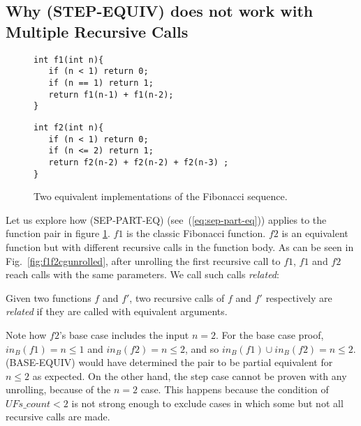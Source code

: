 \subsection{Why (STEP-EQUIV) does not work with Multiple Recursive Calls}
\label{sec:appstepmrc}
\begin{figure}[h]
\begin{center}
\begin{minipage}{7 cm}
\begin{lstlisting}
int f1(int n){
   if (n < 1) return 0;
   if (n == 1) return 1; 
   return f1(n-1) + f1(n-2);
}
\end{lstlisting}
\end{minipage}
\begin{minipage}{7 cm}
\begin{lstlisting}
int f2(int n){
   if (n < 1) return 0;
   if (n <= 2) return 1;
   return f2(n-2) + f2(n-2) + f2(n-3) ;
}
\end{lstlisting}
\end{minipage}
\caption{Two equivalent implementations of the Fibonacci sequence.}
\label{fig:f1f2}
\end{center}
\end{figure}
Let us explore how (SEP-PART-EQ) (see~(\ref{eq:sep-part-eq})) applies to the function pair in figure \ref{fig:f1f2}.
$f1$ is the classic Fibonacci function. $f2$ is an equivalent function but with different recursive calls in the function body. As can be seen in Fig.~\ref{fig:f1f2cgunrolled}, after unrolling the first recursive call to $f1$, $f1$ and $f2$ reach calls with the same parameters. We call such calls \emph{related}: 
\begin{definition}
	\label{def:relatedcalls}
	Given two functions $f$ and $f'$, two recursive calls of $f$ and $f'$ respectively are \emph{related} if they are called with equivalent arguments.  
\end{definition}
Note how  $f2$'s base case includes the input $n=2$. For the base case proof, $in_B(f1) = {n \leq 1}$ and $in_B(f2) = {n \leq 2}$, and so $in_B(f1) \cup in_B(f2) = {n \leq 2}$. (BASE-EQUIV) would have determined the pair to be partial equivalent for ${n \leq 2}$ as expected. On the other hand, the step case cannot be proven with any unrolling, because of the $n=2$ case. This happens because the condition of $UFs\_count < 2$ is not strong enough to exclude cases in which some but not all recursive calls are made.

